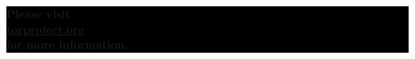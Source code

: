 \documentclass[10.5pt,a4paper]{article} %
\begin{document}
\begin{multicols*}{2}
\begin{center}
	\vfill %
	\colorbox{Black}{
		\begin{minipage}{8cm}
			\color{white}
			\vspace{0.2cm}
			\begin{center}
				\textbf{{\Large Please visit\\\url{torproject.org}\\for more information.}}
			\end{center}
			\vspace{0.2cm}
		\end{minipage}
	}
\end{center}

\vspace{0.75cm}

\end{multicols*}
\end{document}
